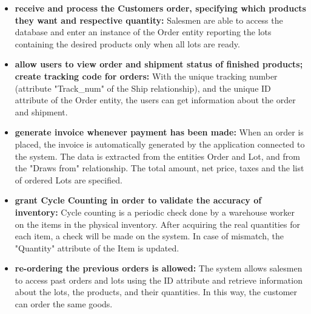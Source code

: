 \begin{itemize}
    \item \textbf{receive and process the Customers order, specifying which products they want and respective quantity:} Salesmen are able to access the database and enter an instance of the Order entity reporting the lots containing the desired products only when all lots are ready.
    \item \textbf{allow users to view order and shipment status of finished products; create tracking code for orders:} With the unique tracking number (attribute "Track\_num" of the Ship relationship), and the unique ID attribute of the Order entity, the users can get information about the order and shipment.
    \item \textbf{generate invoice whenever payment has been made:} When an order is placed, the invoice is automatically generated by the application connected to the system. The data is extracted from the entities Order and Lot, and from the "Draws from" relationship. The total amount, net price, taxes and the list of ordered Lots are specified.
    \item \textbf{grant Cycle Counting in order to validate the accuracy of inventory:} Cycle counting is a periodic check done by a warehouse worker on the items in the physical inventory. After acquiring the real quantities for each item, a check will be made on the system. In case of mismatch, the "Quantity" attribute of the Item is updated. 
    \item \textbf{re-ordering the previous orders is allowed:} The system allows salesmen to access past orders and lots using the ID attribute and retrieve information about the lots, the products, and their quantities. In this way, the customer can order the same goods. 
\end{itemize}



